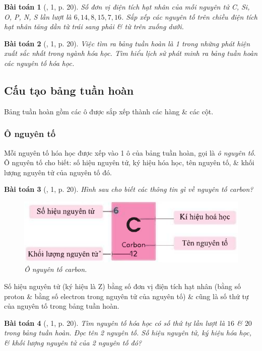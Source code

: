\documentclass{article}
\newtheorem{baitoan}{Bài toán}
\begin{document}
\begin{baitoan}[\cite{SGK_KHTN_7_Canh_Dieu}, 1, p. 20]
	Số đơn vị điện tích hạt nhân của mỗi nguyên tử \emph{C, Si, O, P, N, S} lần lượt là $6,14,8,15,7,16$. Sắp xếp các nguyên tố trên chiều điện tích hạt nhân tăng dần từ trái sang phải \& từ trên xuống dưới.
\end{baitoan}

\begin{baitoan}[\cite{SGK_KHTN_7_Canh_Dieu}, 1, p. 20]
	Việc tìm ra bảng tuần hoàn là 1 trong những phát hiện xuất sắc nhất trong ngành hóa học. Tìm hiểu lịch sử phát minh ra bảng tuần hoàn các nguyên tố hóa học.
\end{baitoan}

\subsection{Cấu tạo bảng tuần hoàn}
Bảng tuần hoàn gồm các ô được sắp xếp thành các hàng \& các cột.

\subsubsection{Ô nguyên tố}
Mỗi nguyên tố hóa học được xếp vào 1 ô của bảng tuần hoàn, gọi là \textit{ô nguyên tố}. Ô nguyên tố cho biết: số hiệu nguyên tử, ký hiệu hóa học, tên nguyên tố, \& khối lượng nguyên tử của nguyên tố đó.

\begin{baitoan}[\cite{SGK_KHTN_7_Canh_Dieu}, 1, p. 20]
	Hình sau cho biết các thông tin gì về nguyên tố carbon?
	\begin{figure}[H]
		\centering
		\includegraphics[scale=0.3]{carbon_element}
		\caption{Ô nguyên tố carbon.}
	\end{figure}
\end{baitoan}
Số hiệu nguyên tử (ký hiệu là Z) bằng số đơn vị điện tích hạt nhân (bằng số proton \& bằng số electron trong nguyên tử của nguyên tố) \& cũng là số thứ tự của nguyên tố trong bảng tuần hoàn.

\begin{baitoan}[\cite{SGK_KHTN_7_Canh_Dieu}, 1, p. 20]
	Tìm nguyên tố hóa học có số thứ tự lần lượt là $16$ \& $20$ trong bảng tuần hoàn. Đọc tên 2 nguyên tố. Số hiệu nguyên tử, ký hiệu hóa học, \& khối lượng nguyên tử của 2 nguyên tố đó?
\end{baitoan}
\end{document}
